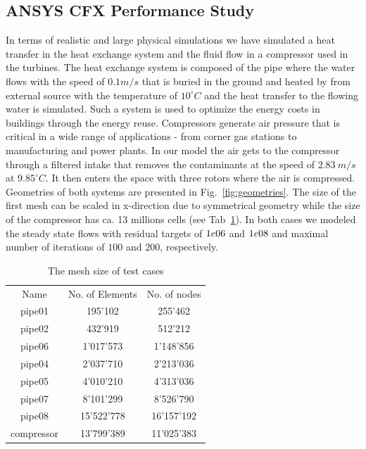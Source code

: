 \documentclass[3p,times]{elsarticle}
\begin{document}
\subsection{ANSYS CFX Performance Study}
	

In terms of realistic and large physical simulations we have simulated a heat transfer in the heat exchange system and the fluid flow in a compressor used in the turbines. The heat exchange system is composed of the  pipe where the water flows with the speed of $0.1 m/s$ that is buried in the ground and heated by from external source with the temperature of $10 ^\circ C$ and the heat transfer to the flowing water is simulated. Such a system is used to optimize the energy costs in buildings through the energy reuse.  
Compressors generate air pressure that is critical in a wide range of applications - from corner gas stations to manufacturing and power plants. In our model the air gets to the compressor through a filtered intake that removes the contaminants at the speed of $2.83\ m/s$ at $9.85 ^\circ C$. It then enters the space with three rotors where the air is compressed. Geometries of both systems are presented in Fig.~\ref{fig:geometries}. The size of the first mesh can be scaled  in x-direction due to symmetrical geometry while the size of the compressor has ca. 13 millions cells (see Tab~\ref{tab:MeshSize}). In both cases we modeled the steady state flows with residual targets of $1e\-06$ and $1e\-08$ and maximal number of iterations of $100$ and $200$, respectively. 

\begin{table}
	\centering
		\begin{tabular} {|c|c|c|}
			\hline
			Name & No. of Elements & No. of nodes \\			
			pipe01 & 195'102 & 255'462 \\ \hline
			pipe02 & 432'919 & 512'212 \\ \hline
			pipe06 & 1'017'573 & 1'148'856 \\ \hline
			pipe04 & 2'037'710 & 2'213'036 \\ \hline
			pipe05 & 4'010'210 & 4'313'036 \\ \hline			
			pipe07 & 8'101'299 & 8'526'790 \\ \hline
			pipe08 & 15'522'778 & 16'157'192 \\ \hline
			compressor & 13'799'389  & 11'025'383 \\ \hline
		\end{tabular}
	\caption{The mesh size of test cases}
	\label{tab:MeshSize}
\end{table}
\end{document}
